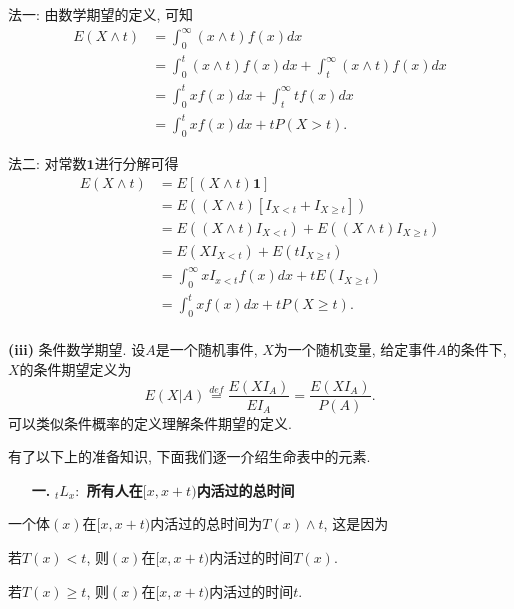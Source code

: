 \documentclass[a4paper,openany, 10pt]{ctexbook}
\newcommand{\hei}{\CJKfamily{hei}}      %
\begin{document}
法一: 由数学期望的定义, 可知
\begin{align*}
    E(X\wedge t) & =\int_0^{\infty}(x\wedge t)f(x)dx                           \\
                 & =\int_0^t(x\wedge t)f(x)dx+\int_t^{\infty}(x\wedge t)f(x)dx \\
                 & =\int_0^txf(x)dx+\int_t^{\infty}tf(x)dx                     \\
                 & =\int_0^txf(x)dx+tP(X>t).
\end{align*}


法二: 对常数$\mathbf 1$进行分解可得
\begin{align*}
    E(X\wedge t) & =E[(X\wedge t)\mathbf{1}]                                \\
                 & =E((X\wedge t)[I_{X<t}+I_{X\ge t}])             \\
                 & =E((X\wedge t)I_{X<t})+E((X\wedge t)I_{X\ge t}) \\
                 & =E(XI_{X<t})+E(tI_{X\ge t})                     \\
                 & =\int_0^{\infty}xI_{x<t}f(x)dx+tE(I_{X\ge t})   \\
                 & =\int_0^t xf(x)dx+tP(X\ge t).                   \\
\end{align*}


{\rm\bf(iii)} 条件数学期望. 设$A$是一个随机事件, $X$为一个随机变量, 给定事件$A$的条件下, $X$的条件期望定义为
$$E(X|A)\overset{def}{=}\frac{E(XI_A)}{EI_A}=\frac{E(XI_A)}{P(A)}.$$
可以类似条件概率的定义理解条件期望的定义.

有了以下上的准备知识, 下面我们逐一介绍生命表中的元素.

\begin{itemize}
    \item[{\bf\hei 一.}]{\bf\hei ${}_tL_x:$ 所有人在$[x,x+t)$内活过的总时间}
\end{itemize}


一个体$(x)$在$[x,x+t)$内活过的总时间为$T(x)\wedge t$, 这是因为

若$T(x)<t$, 则$(x)$在$[x,x+t)$内活过的时间$T(x).$

若$T(x)\ge t$, 则$(x)$在$[x,x+t)$内活过的时间$t.$
\end{document}
